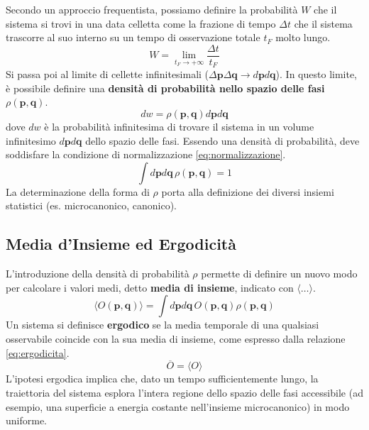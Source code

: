 Secondo un approccio frequentista, possiamo definire la probabilità $W$ che il sistema si trovi in una data celletta come la frazione di tempo $\Delta t$ che il sistema trascorre al suo interno su un tempo di osservazione totale $t_F$ molto lungo.
\begin{equation}
    W=\lim_{t_{F}\rightarrow+\infty}\frac{\Delta t}{t_{F}}
    \label{eq:prob_frequentista}
\end{equation}
Si passa poi al limite di cellette infinitesimali ($\Delta\mathbf{p}\Delta\mathbf{q}\rightarrow d\mathbf{p}d\mathbf{q}$). In questo limite, è possibile definire una \textbf{densità di probabilità nello spazio delle fasi} $\rho(\mathbf{p},\mathbf{q})$.
\begin{equation}
    dw=\rho(\mathbf{p},\mathbf{q})d\mathbf{p}d\mathbf{q}
    \label{eq:densita_prob}
\end{equation}
dove $dw$ è la probabilità infinitesima di trovare il sistema in un volume infinitesimo $d\mathbf{p}d\mathbf{q}$ dello spazio delle fasi. Essendo una densità di probabilità, deve soddisfare la condizione di normalizzazione \eqref{eq:normalizzazione}.
\begin{equation}
    \int d\mathbf{p}d\mathbf{q}\,\rho(\mathbf{p},\mathbf{q})=1
    \label{eq:normalizzazione}
\end{equation}
La determinazione della forma di $\rho$ porta alla definizione dei diversi insiemi statistici (es. microcanonico, canonico).

\subsection*{Media d'Insieme ed Ergodicità}

L'introduzione della densità di probabilità $\rho$ permette di definire un nuovo modo per calcolare i valori medi, detto \textbf{media di insieme}, indicato con $\langle \dots \rangle$.
\begin{equation}
    \langle O(\mathbf{p},\mathbf{q})\rangle=\int d\mathbf{p}d\mathbf{q}\,O(\mathbf{p},\mathbf{q})\rho(\mathbf{p},\mathbf{q})
    \label{eq:media_insieme}
\end{equation}
Un sistema si definisce \textbf{ergodico} se la media temporale di una qualsiasi osservabile coincide con la sua media di insieme, come espresso dalla relazione \eqref{eq:ergodicita}.
\begin{equation}
    \overline{O}=\langle O\rangle
    \label{eq:ergodicita}
\end{equation}
L'ipotesi ergodica implica che, dato un tempo sufficientemente lungo, la traiettoria del sistema esplora l'intera regione dello spazio delle fasi accessibile (ad esempio, una superficie a energia costante nell'insieme microcanonico) in modo uniforme.

